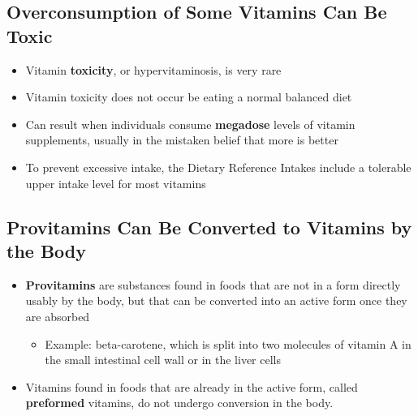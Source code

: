 \documentclass[12pt]{article}
\begin{document}
        \subsection{Overconsumption of Some Vitamins Can Be Toxic}
            \begin{itemize}
                \item Vitamin \textbf{toxicity}, or hypervitaminosis, is very rare
                \item Vitamin toxicity does not occur be eating a normal balanced diet
                \item Can result when individuals consume \textbf{megadose} levels of vitamin supplements, usually in the mistaken belief that more is better
                \item To prevent excessive intake, the Dietary Reference Intakes include a tolerable upper intake level for most vitamins
            \end{itemize}
        
        \subsection{Provitamins Can Be Converted to Vitamins by the Body}
            \begin{itemize}
                \item \textbf{Provitamins} are substances found in foods that are not in a form directly usably by the body, but that can be converted into an active form once they are absorbed
                    \begin{itemize}
                        \item Example: beta-carotene, which is split into two molecules of vitamin A in the small intestinal cell wall or in the liver cells
                    \end{itemize}
                \item Vitamins found in foods that are already in the active form, called \textbf{preformed} vitamins, do not undergo conversion in the body.
            \end{itemize}
        
\end{document}
